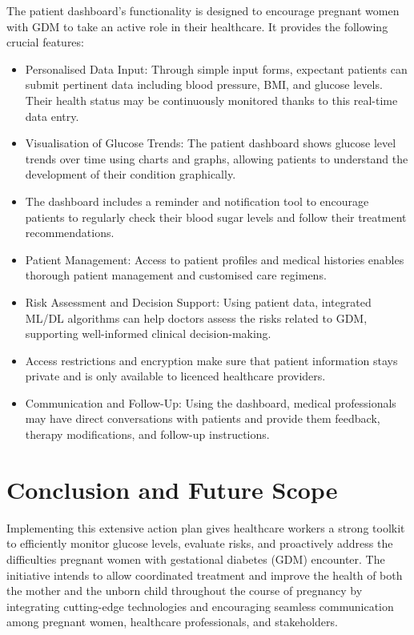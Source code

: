 \documentclass[conference,compsoc]{IEEEtran}
\begin{document}
The patient dashboard's functionality is designed to encourage pregnant women with GDM to take an active role in their healthcare. It provides the following crucial features:
\begin{itemize}
 \item Personalised Data Input: Through simple input forms, expectant patients can submit pertinent data including blood pressure, BMI, and glucose levels. Their health status may be continuously monitored thanks to this real-time data entry.
\item Visualisation of Glucose Trends: The patient dashboard shows glucose level trends over time using charts and graphs, allowing patients to understand the development of their condition graphically.
\item The dashboard includes a reminder and notification tool to encourage patients to regularly check their blood sugar levels and follow their treatment recommendations.
\item Patient Management: Access to patient profiles and medical histories enables thorough patient management and customised care regimens.

\item Risk Assessment and Decision Support: Using patient data, integrated ML/DL algorithms can help doctors assess the risks related to GDM, supporting well-informed clinical decision-making.

\item Access restrictions and encryption make sure that patient information stays private and is only available to licenced healthcare providers.

\item Communication and Follow-Up: Using the dashboard, medical professionals may have direct conversations with patients and provide them feedback, therapy modifications, and follow-up instructions.
\end{itemize}

\section{Conclusion and Future Scope}
Implementing this extensive action plan gives healthcare workers a strong toolkit to efficiently monitor glucose levels, evaluate risks, and proactively address the difficulties pregnant women with gestational diabetes (GDM) encounter. The initiative intends to allow coordinated treatment and improve the health of both the mother and the unborn child throughout the course of pregnancy by integrating cutting-edge technologies and encouraging seamless communication among pregnant women, healthcare professionals, and stakeholders.
\end{document}
